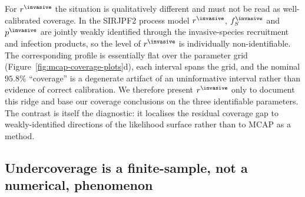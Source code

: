 {For $r^{\invasive}$ the situation is qualitatively different and must not be read as well-calibrated coverage.
In the SIRJPF2 process model $r^{\invasive}$, $f_S^{\invasive}$ and $p^{\invasive}$ are jointly weakly identified through the invasive-species recruitment and infection products, so the level of $r^{\invasive}$ is individually non-identifiable.
The corresponding profile is essentially flat over the parameter grid (Figure~\ref{fig:mcap-coverage-plots}d), each interval spans the grid, and the nominal $95.8\%$ ``coverage'' is a degenerate artifact of an uninformative interval rather than evidence of correct calibration.
We therefore present $r^{\invasive}$ only to document this ridge and base our coverage conclusions on the three identifiable parameters.
The contrast is itself the diagnostic: it localises the residual coverage gap to weakly-identified directions of the likelihood surface rather than to MCAP as a method.}

\subsection{Undercoverage is a finite-sample, not a numerical, phenomenon}

